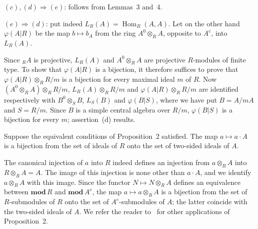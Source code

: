 $(c),(d)\Rightarrow(e)$: follows from Lemmas~3 and~4.

$(e)\Rightarrow(d)$: put indeed $L_R(A)=\operatorname{Hom}_R(A,A)$.
Let on the other hand $\varphi(A|R)$ be the map $b\mapsto b_A$ from
the ring $A^0\otimes_R A$, opposite to $A^e$, into $L_R(A)$.

Since ${}_RA$ is projective, $L_R(A)$ and $A^0\otimes_R A$ are
projective $R$-modules of finite type.  To show that $\varphi(A|R)$ is
a bijection, it therefore suffices to prove that
$\varphi(A|R)\otimes_R R/m$ is a bijection for every maximal ideal $m$
of $R$.  Now $(A^0\otimes_R A)\otimes_R R/m$,
$L_R(A)\otimes_R R/m$ and $\varphi(A|R)\otimes_R R/m$ are identified
respectively with $B^0\otimes_S B$, $L_S(B)$ and $\varphi(B|S)$, where
we have put $B=A/mA$ and $S=R/m$.  Since $B$ is a simple central
algebra over $R/m$, $\varphi(B|S)$ is a bijection for every $m$;
assertion~(d) results.

\begin{unnumberedcorollary}
Suppose the equivalent conditions of Proposition~2 satisfied.  The map
$a\mapsto a\cdot A$ is a bijection from the set of ideals of $R$ onto
the set of two-sided ideals of $A$.
\end{unnumberedcorollary}

The canonical injection of $a$ into $R$ indeed defines an injection
from $a\otimes_R A$ into $R\otimes_R A=A$.  The image of this injection
is none other than $a\cdot A$, and we identify $a\otimes_R A$ with this
image.  Since the functor $N\mapsto N\otimes_R A$ defines an
equivalence between $\mathbf{mod}\,R$ and $\mathbf{mod}\,A^e$, the map
$a\mapsto a\otimes_R A$ is a bijection from the set of $R$-submodules
of $R$ onto the set of $A^e$-submodules of $A$; the latter coincide
with the two-sided ideals of $A$.  We refer the reader
to~\cite{auslander-goldman} for other applications of
Proposition~2.
